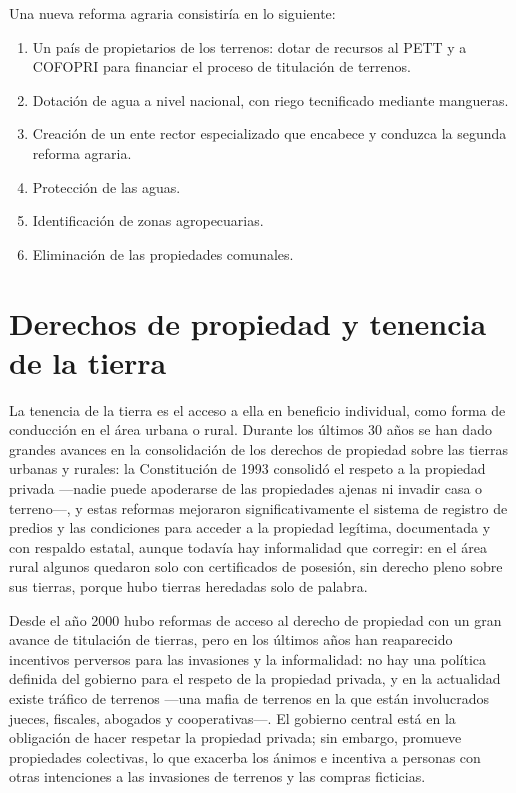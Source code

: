 \documentclass[
  man,
  floatsintext,
  longtable,
  a4paper,
  nolmodern,
  notxfonts,
  notimes,
  12pt,
  colorlinks=true,linkcolor=blue,citecolor=blue,urlcolor=blue]{apa7}
\begin{document}
Una nueva reforma agraria consistiría en lo siguiente:

\begin{enumerate}
\def\labelenumi{\arabic{enumi}.}
\item
  Un país de propietarios de los terrenos: dotar de recursos al PETT y a
  COFOPRI para financiar el proceso de titulación de terrenos.
\item
  Dotación de agua a nivel nacional, con riego tecnificado mediante
  mangueras.
\item
  Creación de un ente rector especializado que encabece y conduzca la
  segunda reforma agraria.
\item
  Protección de las aguas.
\item
  Identificación de zonas agropecuarias.
\item
  Eliminación de las propiedades comunales.
\end{enumerate}

\section{Derechos de propiedad y tenencia de la
tierra}\label{derechos-de-propiedad-y-tenencia-de-la-tierra}

La tenencia de la tierra es el acceso a ella en beneficio individual,
como forma de conducción en el área urbana o rural. Durante los últimos
30 años se han dado grandes avances en la consolidación de los derechos
de propiedad sobre las tierras urbanas y rurales: la Constitución de
1993 consolidó el respeto a la propiedad privada ---nadie puede
apoderarse de las propiedades ajenas ni invadir casa o terreno---, y
estas reformas mejoraron significativamente el sistema de registro de
predios y las condiciones para acceder a la propiedad legítima,
documentada y con respaldo estatal, aunque todavía hay informalidad que
corregir: en el área rural algunos quedaron solo con certificados de
posesión, sin derecho pleno sobre sus tierras, porque hubo tierras
heredadas solo de palabra.

Desde el año 2000 hubo reformas de acceso al derecho de propiedad con un
gran avance de titulación de tierras, pero en los últimos años han
reaparecido incentivos perversos para las invasiones y la informalidad:
no hay una política definida del gobierno para el respeto de la
propiedad privada, y en la actualidad existe tráfico de terrenos ---una
mafia de terrenos en la que están involucrados jueces, fiscales,
abogados y cooperativas---. El gobierno central está en la obligación de
hacer respetar la propiedad privada; sin embargo, promueve propiedades
colectivas, lo que exacerba los ánimos e incentiva a personas con otras
intenciones a las invasiones de terrenos y las compras ficticias.
\end{document}
